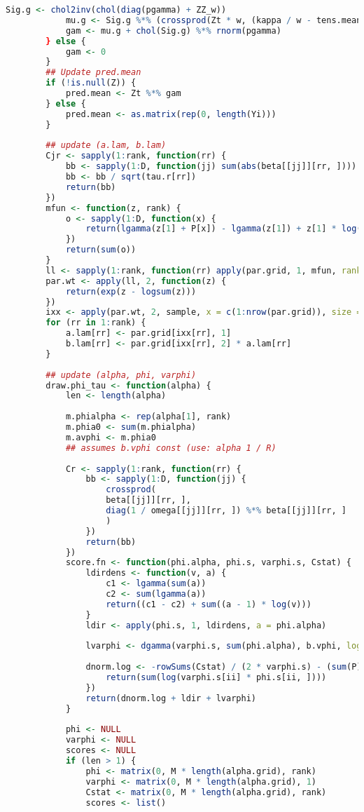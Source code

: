 \documentclass[AutoFakeBold]{LZUThesis}
\begin{document}
\begin{lstlisting}[language = R, caption = {BT-LR}算法]
			Sig.g <- chol2inv(chol(diag(pgamma) + ZZ_w))
			mu.g <- Sig.g %*% (crossprod(Zt * w, (kappa / w - tens.mean))) # incorporate rho in mean
			gam <- mu.g + chol(Sig.g) %*% rnorm(pgamma)
		} else {
			gam <- 0
		}
		## Update pred.mean
		if (!is.null(Z)) {
			pred.mean <- Zt %*% gam
		} else {
			pred.mean <- as.matrix(rep(0, length(Yi)))
		}
		
		## update (a.lam, b.lam)
		Cjr <- sapply(1:rank, function(rr) {
			bb <- sapply(1:D, function(jj) sum(abs(beta[[jj]][rr, ])))
			bb <- bb / sqrt(tau.r[rr])
			return(bb)
		})
		mfun <- function(z, rank) {
			o <- sapply(1:D, function(x) {
				return(lgamma(z[1] + P[x]) - lgamma(z[1]) + z[1] * log(z[2] * z[1]) - (z[1] + P[x]) * log(z[2] * z[1] + Cjr[x, rank]))
			})
			return(sum(o))
		}
		ll <- sapply(1:rank, function(rr) apply(par.grid, 1, mfun, rank = rr))
		par.wt <- apply(ll, 2, function(z) {
			return(exp(z - logsum(z)))
		})
		ixx <- apply(par.wt, 2, sample, x = c(1:nrow(par.grid)), size = 1, replace = F)
		for (rr in 1:rank) {
			a.lam[rr] <- par.grid[ixx[rr], 1]
			b.lam[rr] <- par.grid[ixx[rr], 2] * a.lam[rr]
		}
		
		## update (alpha, phi, varphi)
		draw.phi_tau <- function(alpha) {
			len <- length(alpha)
			
			m.phialpha <- rep(alpha[1], rank)
			m.phia0 <- sum(m.phialpha)
			m.avphi <- m.phia0
			## assumes b.vphi const (use: alpha 1 / R)
			
			Cr <- sapply(1:rank, function(rr) {
				bb <- sapply(1:D, function(jj) {
					crossprod(
					beta[[jj]][rr, ],
					diag(1 / omega[[jj]][rr, ]) %*% beta[[jj]][rr, ]
					)
				})
				return(bb)
			})
			score.fn <- function(phi.alpha, phi.s, varphi.s, Cstat) {
				ldirdens <- function(v, a) {
					c1 <- lgamma(sum(a))
					c2 <- sum(lgamma(a))
					return((c1 - c2) + sum((a - 1) * log(v)))
				}
				ldir <- apply(phi.s, 1, ldirdens, a = phi.alpha)
				
				lvarphi <- dgamma(varphi.s, sum(phi.alpha), b.vphi, log = T)
				
				dnorm.log <- -rowSums(Cstat) / (2 * varphi.s) - (sum(P) / 2) * sapply(1:length(varphi.s), function(ii) {
					return(sum(log(varphi.s[ii] * phi.s[ii, ])))
				})
				return(dnorm.log + ldir + lvarphi)
			}
			
			phi <- NULL
			varphi <- NULL
			scores <- NULL
			if (len > 1) {
				phi <- matrix(0, M * length(alpha.grid), rank)
				varphi <- matrix(0, M * length(alpha.grid), 1)
				Cstat <- matrix(0, M * length(alpha.grid), rank)
				scores <- list()
				

\end{lstlisting}
\end{document}
